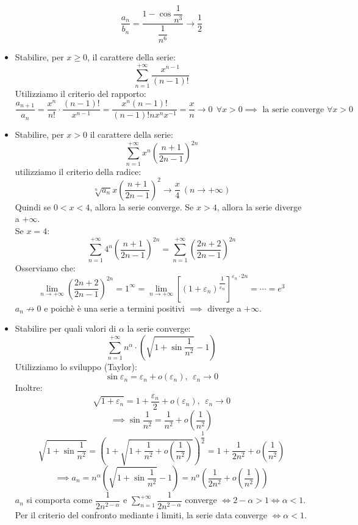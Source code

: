 \documentclass[../main.tex]{subfiles}
\begin{document}
\begin{itemize}
\[              \dfrac{a_n}{b_n} = \dfrac{1-\cos{\dfrac{1}{n^3}}}{\dfrac{1}{n^6}} \to \dfrac{1}{2}
          \]
    \item Stabilire, per $x\geq0$, il carattere della serie:
          \[
              \sum_{n=1}^{+\infty} \dfrac{x^{n-1}}{(n-1)!}
          \]
          Utilizziamo il criterio del rapporto:
          \[
              \dfrac{a_{n+1}}{a_n} = \dfrac{x^n}{n!} \cdot \dfrac{(n-1)!}{x^{n-1}} = \dfrac{x^n(n-1)!}{(n-1)!nx^nx^{-1}} = \dfrac{x}{n} \to 0 \ \ \forall x > 0 \implies \text{ la serie converge } \forall x > 0
          \]
    \item Stabilire, per $x > 0$ il carattere della serie:
          \[
              \sum_{n=1}^{+\infty} x^n (\dfrac{n+1}{2n-1})^{2n}
          \]
          utilizziamo il criterio della radice:
          \[
              \sqrt[n]{a_n} x\left(\dfrac{n+1}{2n-1}\right)^2 \rightarrow \dfrac{x}{4}\ (n \to +\infty)
          \]
          Quindi se $0 < x < 4$, allora la serie converge. Se $x > 4$, allora la serie
          diverge a $+\infty$. \\ Se $x = 4$:
          \[
              \sum_{n=1}^{+\infty} 4^n\left(\dfrac{n+1}{2n-1}\right)^{2n} = \sum_{n=1}^{+\infty}\left(\dfrac{2n+2}{2n-1}\right)^{2n}
          \]
          Osserviamo che:
          \[
              \lim_{n\to+\infty} \left(\dfrac{2n+2}{2n-1}\right)^{2n} = 1^\infty
              = \lim_{n\to+\infty} \left[(1+\varepsilon_n)^{\dfrac{1}{\varepsilon_n}}\right]^{\varepsilon_n\cdot 2n}
              = \cdots = e^3
          \]
          $a_n \not\to 0$ e poichè è una serie a termini positivi $\implies$ diverge a $+\infty$.
    \item Stabilire per quali valori di $\alpha$ la serie converge:
          \[
              \sum_{n=1}^{+\infty} n^\alpha \cdot (\sqrt{1+\sin\dfrac{1}{n^2}} -1)
          \]
          Utilizziamo lo sviluppo (Taylor):
          \[
              \sin{\varepsilon_n} = \varepsilon_n + o(\varepsilon_n), \ \ \varepsilon_n \to 0
          \]
          Inoltre:
          \[
              \sqrt{1+\varepsilon_n} = 1 + \dfrac{\varepsilon_n}{2} + o(\varepsilon_n), \ \ \varepsilon_n \to 0
          \]
          \[
              \implies \sin{\dfrac{1}{n^2}} = \dfrac{1}{n^2} + o(\dfrac{1}{n^2})
          \]
          \[
              \sqrt{1+\sin{\dfrac{1}{n^2}}} = \left(1 +\sqrt{1+\dfrac{1}{n^2} + o(\dfrac{1}{n^2})}\right)^{\dfrac{1}{2}} = 1 + \dfrac{1}{2n^2} + o(\dfrac{1}{n^2})
          \]
          \[
              \implies a_n = n^\alpha (\sqrt{1+\sin{\dfrac{1}{n^2}}} - 1) = n^\alpha \left(\dfrac{1}{2n^2} + o(\dfrac{1}{n^2})\right)
          \]
          $a_n$ si comporta come $\dfrac{1}{2n^{2-\alpha}}$ e $\sum_{n=1}^{+\infty} \dfrac{1}{2n^{2-\alpha}}$ converge $\iff 2-\alpha > 1 \iff \alpha < 1$. Per il criterio del confronto mediante i limiti, la serie data converge $\iff \alpha < 1$.
\end{itemize}
\end{document}
